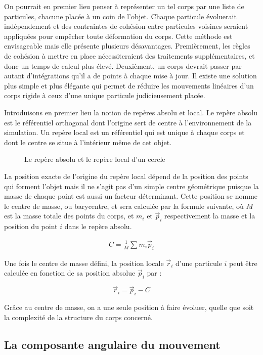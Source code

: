 On pourrait en premier lieu penser à représenter un tel corps par une liste de particules, chacune placée à un coin de l'objet. Chaque particule évoluerait indépendement et des contraintes de cohésion entre particules voisines seraient appliquées pour empêcher toute déformation du corps. Cette méthode est envisageable mais elle présente plusieurs désavantages. Premièrement, les règles de cohésion à mettre en place nécessiteraient des traitements supplémentaires, et donc un temps de calcul plus élevé. Deuxièment, un corps devrait passer par autant d'intégrations qu'il a de points à chaque mise à jour. Il existe une solution plus simple et plus élégante qui permet de réduire les mouvements linéaires d'un corps rigide à ceux d'une unique particule judicieusement placée.

Introduisons en premier lieu la notion de repères absolu et local. Le repère absolu est le référentiel orthogonal dont l'origine sert de centre à l'environnement de la simulation. Un repère local est un référentiel qui est unique à chaque corps et dont le centre se situe à l'intérieur même de cet objet.

\begin{figure}
  
  \caption{Le repère absolu et le repère local d'un cercle}
\end{figure}

La position exacte de l'origine du repère local dépend de la position des points qui forment l'objet mais il ne s'agit pas d'un simple centre géométrique puisque la masse de chaque point est aussi un facteur déterminant. Cette position se nomme le centre de masse, ou barycentre, et sera calculée par la formule suivante, o\`u $M$ est la masse totale des points du corps, et $m_i$ et $\vec{p}_i$ respectivement la masse et la position du point $i$ dans le repère absolu.

\begin{align*}
  C = \frac{1}{M} \sum m_i \vec{p}_i
\end{align*}

Une fois le centre de masse défini, la position locale $\vec{r}_i$ d'une particule $i$ peut être calculée en fonction de sa position absolue $\vec{p}_i$ par :

\[\vec{r}_i = \vec{p}_i - C\]

Grâce au centre de masse, on a une seule position à faire évoluer, quelle que soit la complexité de la structure du corps concerné.

\subsection{La composante angulaire du mouvement}

